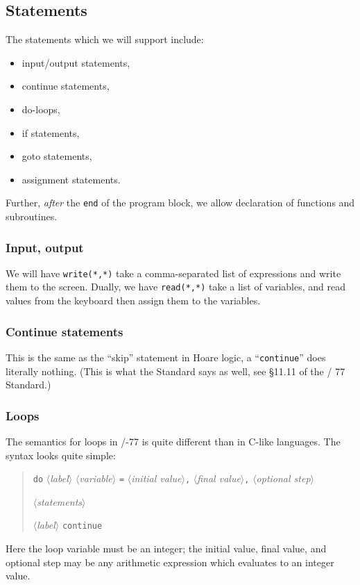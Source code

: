 \subsection{Statements}
The statements which we will support include:
\begin{itemize}
\item input/output statements,
\item continue statements,
\item do-loops,
\item if statements,
\item goto statements,
\item assignment statements.
\end{itemize}
Further, \emph{after} the \texttt{end} of the program block, we allow
declaration of functions and subroutines.

\subsubsection{Input, output}
We will have \texttt{write(*,*)} take a comma-separated list of
expressions and write them to the screen. Dually, we have
\texttt{read(*,*)} take a list of variables, and read values from the
keyboard then assign them to the variables.

\subsubsection{Continue statements}
This is the same as the ``skip'' statement in Hoare logic, a
``\texttt{continue}'' does literally nothing. (This is what the Standard
says as well, see \S11.11 of the \FORTRAN/ 77 Standard.)

\subsubsection{Loops}
The semantics for loops in \FORTRAN/-77 is quite different than in
C-like languages. The syntax looks quite simple:
\begin{quotation}
\noindent\texttt{do} $\langle$\textit{label\/}$\rangle$
$\langle$\textit{variable\/}$\rangle$
\texttt{=} $\langle$\textit{initial value\/}$\rangle$\texttt{,}
$\langle$\textit{final value\/}$\rangle$\texttt{,}
$\langle$\textit{optional step\/}$\rangle$

$\langle$\textit{statements\/}$\rangle$

\noindent$\langle$\textit{label\/}$\rangle$ \texttt{continue}
\end{quotation}
Here the loop variable must be an integer; the initial value, final
value, and optional step may be any arithmetic expression which
evaluates to an integer value.

